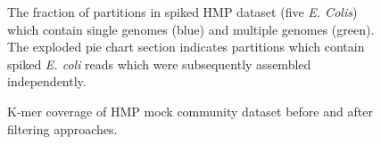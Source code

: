 \documentclass[11pt]{article} %
\begin{document}
\begin{figure}[ht]
\caption{The fraction of partitions in spiked HMP dataset (five
  \emph{E. Colis}) which contain single genomes (blue) and multiple
  genomes (green).  The exploded pie chart section indicates
  partitions which contain spiked \emph{E. coli} reads which were
  subsequently assembled independently. }
\label{ecolimap2}
\end{figure}


\begin{figure}[ht]
\caption{ K-mer coverage of HMP mock community dataset before and
  after filtering approaches.}
\label{kmercoverage}
\end{figure}
\end{document}
